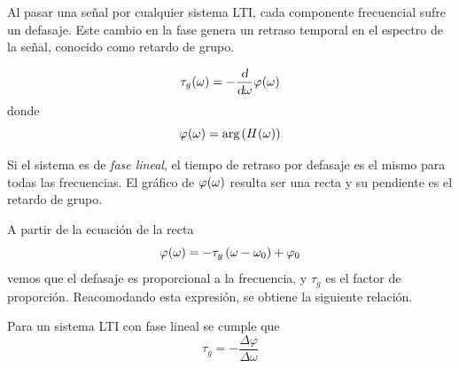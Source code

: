 Al pasar una señal por cualquier sistema LTI, cada componente frecuencial sufre un defasaje.
Este cambio en la fase genera un retraso temporal en el espectro de la señal, conocido como retardo de grupo.

\begin{mdframed}[style=DefinitionFrame]
    \begin{defn}
        \label{defn:groupDelay}
    \end{defn}
    \[
        \fx[\tau_g]{\omega} = - \frac{\dif}{\dif \omega} \fx[\varphi]{\omega}
    \]
    donde
    \[
        \fx[\varphi]{\omega} = \fx[\arg]{\fx[H]{\omega}}
    \]
\end{mdframed}

Si el sistema es de \emph{fase lineal}, el tiempo de retraso por defasaje es el mismo para todas las frecuencias.
El gráfico de $\fx[\varphi]{\omega}$ resulta ser una recta y su pendiente es el retardo de grupo.

A partir de la ecuación de la recta
\[
    \fx[\varphi]{\omega} = - \tau_g \inParentheses{\omega - \omega_0} + \varphi_0
\]
vemos que el defasaje es proporcional a la frecuencia, y $\tau_g$ es el factor de proporción.
Reacomodando esta expresión, se obtiene la siguiente relación.

\begin{mdframed}[style=PropertyFrame]
    \begin{prop}
        \label{prop:groupDelay}
    \end{prop}
    Para un sistema LTI con fase lineal se cumple que
    \[
        \tau_g = - \frac{\Delta \varphi}{\Delta \omega}
    \]
\end{mdframed}

